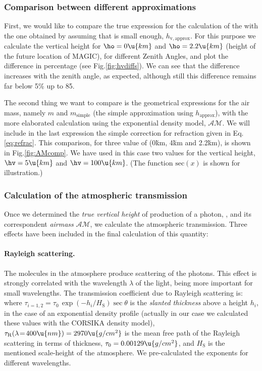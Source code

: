 \subsubsection{Comparison between different approximations}

First, we would like to compare the true expression for the
calculation of the \hv with the one obtained by assuming that \ho is
small enough, $h_{\mathrm{v,approx}}$. For this purpose we calculate
the vertical height for $\ho=0\u{km}$ and $\ho=2.2\u{km}$ (height of
the future location of MAGIC), for different Zenith Angles, and plot
the difference in percentage (see Fig.\ref{fig:hvdiffs}). We can see
that the difference increases with the zenith angle, as expected,
although still this difference remains far below 5\% up to 85\deg.

\hvdiffsfig

The second thing we want to compare is the geometrical expressions for
the air mass, namely $m$ and $m_{\mathrm{simple}}$ (the simple
approximation using $h_{\mathrm{approx}}$), with the more elaborated
calculation using the exponential density model, $\mathcal{AM}$. We
will include in the last expression the simple correction for
refraction given in Eq.\eqref{eq:refrac}. This comparison, for three
value of \ho (0\u{km}, 4\u{km} and 2.2\u{km}), is shown in
Fig.\ref{fig:AMcomp}. We have used in this case two values for the
vertical height, $\hv=5\u{km}$ and $\hv=100\u{km}$. (The function
$\mathrm{sec}(x)$ is shown for illustration.)

\AMcompfig

\subsubsection{Calculation of the atmospheric transmission}

Once we determined the \emph{true vertical height} of production of a
photon, \hv, and its correspondent \emph{airmass} $\mathcal{AM}$, we
calculate the atmospheric transmission. Three effects have been
included in the final calculation of this quantity:

\paragraph{Rayleigh scattering.} The molecules in the atmosphere
produce scattering of the photons. This effect is strongly correlated
with the wavelength $\lambda$ of the light, being more important for
small wavelengths. The transmission coefficient due to Rayleigh
scattering is:
%
\Rayleigheq
%
where $\tau_{i=1,2} = \tau_0 \, \exp(-h_i/H_{\mathrm{S}}) \sec\theta$
is the \emph{slanted thickness} above a height $h_i$, in the case of
an exponential density profile (actually in our case we calculated
these values with the CORSIKA density model),
$\tau_{\mathrm{R}}(\lambda\!=\!400\u{nm}) = 2970\u{g/cm^2}$ is the
mean free path of the Rayleigh scattering in terms of thickness,
$\tau_0 = 0.00129\u{g/cm^2}$, and $H_{\mathrm{S}}$ is the mentioned
scale-height of the atmosphere. We pre-calculated the exponents for
different wavelengths.
  
